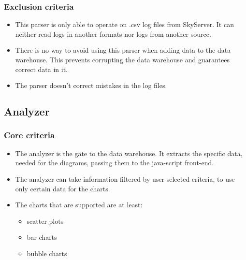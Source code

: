  
\subsubsection{Exclusion criteria}
\begin{itemize}
\item This \gls{parser} is only able to operate on \gls{.csv} \glspl{log file} from \gls{SkyServer}. 
It can neither read logs in another formats nor logs from another source.

\item There is no way to avoid using this \gls{parser} when adding data to the \gls{data warehouse}. 
This prevents corrupting the \gls{data warehouse} and guarantees correct data in it.

\item The \gls{parser} doesn't correct mistakes in the \glspl{log file}.
\end{itemize}



\subsection{Analyzer}

\subsubsection{Core criteria}
\begin{itemize}
\item The analyzer is the gate to the \gls{data warehouse}. It extracts the specific data, 
needed for the \glspl{diagram}, passing them to the java-script front-end.
\item The analyzer can take information filtered by user-selected criteria, 
to use only certain data for the \glspl{chart}.
\item The \glspl{chart} that are supported are at least:
\begin{itemize}
\item \glspl{scatter plot}
\item \glspl{bar chart}
\item \glspl{bubble chart}
\end{itemize}

\end{itemize}

